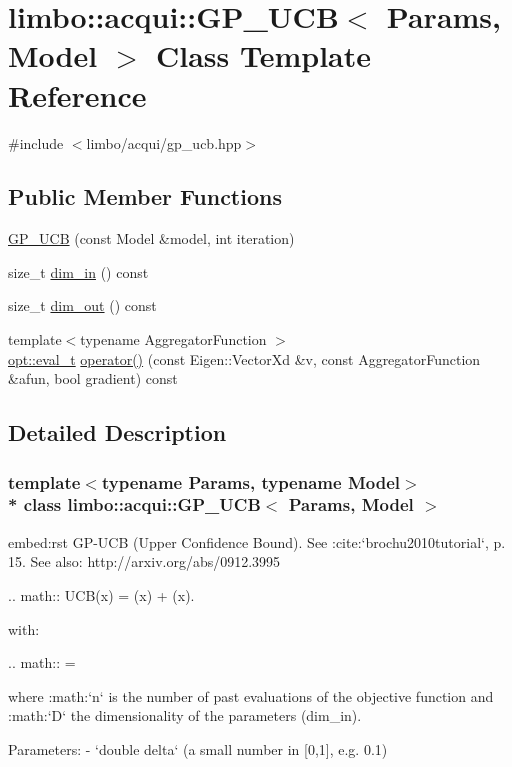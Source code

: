 \hypertarget{classlimbo_1_1acqui_1_1_g_p___u_c_b}{}\section{limbo\+:\+:acqui\+:\+:G\+P\+\_\+\+U\+CB$<$ Params, Model $>$ Class Template Reference}
\label{classlimbo_1_1acqui_1_1_g_p___u_c_b}


{\ttfamily \#include $<$limbo/acqui/gp\+\_\+ucb.\+hpp$>$}

\subsection*{Public Member Functions}
\begin{DoxyCompactItemize}
\item 
\hyperlink{classlimbo_1_1acqui_1_1_g_p___u_c_b_a9846faaa39b1d1d7b039284f2c905205}{G\+P\+\_\+\+U\+CB} (const Model \&model, int iteration)
\item 
size\+\_\+t \hyperlink{classlimbo_1_1acqui_1_1_g_p___u_c_b_a30c58b2f857da76de61e8cf555e73d06}{dim\+\_\+in} () const 
\item 
size\+\_\+t \hyperlink{classlimbo_1_1acqui_1_1_g_p___u_c_b_abde3ddcfa0bfb16d453587832f4e78b1}{dim\+\_\+out} () const 
\item 
{\footnotesize template$<$typename Aggregator\+Function $>$ }\\\hyperlink{group__opt__tools_ga362b55973a38ac71f27a06f9d9c14f24}{opt\+::eval\+\_\+t} \hyperlink{classlimbo_1_1acqui_1_1_g_p___u_c_b_a81dbe2aae8aea9d463547ac4d9236741}{operator()} (const Eigen\+::\+Vector\+Xd \&v, const Aggregator\+Function \&afun, bool gradient) const 
\end{DoxyCompactItemize}


\subsection{Detailed Description}
\subsubsection*{template$<$typename Params, typename Model$>$\\*
class limbo\+::acqui\+::\+G\+P\+\_\+\+U\+C\+B$<$ Params, Model $>$}

\begin{DoxyVerb}embed:rst
GP-UCB (Upper Confidence Bound). See :cite:`brochu2010tutorial`, p. 15. See also: http://arxiv.org/abs/0912.3995

.. math::
  UCB(x) = \mu(x) + \kappa \sigma(x).

with:

.. math::
  \kappa = 

where :math:`n` is the number of past evaluations of the objective function and :math:`D` the dimensionality of the parameters (dim_in).

Parameters:
  - `double delta` (a small number in [0,1], e.g. 0.1)
\end{DoxyVerb}
 

